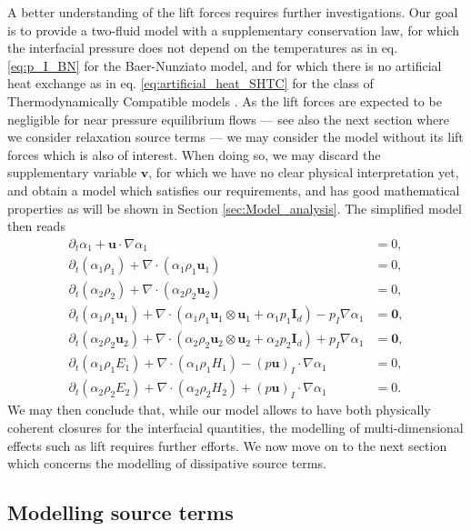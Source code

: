 \documentclass{myclass}
\newcommand{\Id}{\mathbf{I}_d}
\newcommand{\vel}{\bm{u}}
\newcommand{\pth}[1]  {\left( #1 \right)}
\begin{document}
A better understanding of the lift forces requires further investigations. Our goal is to provide a two-fluid model with a supplementary conservation law, for which the interfacial pressure does not depend on the temperatures as in eq. \eqref{eq:p_I_BN} for the Baer-Nunziato model, and for which there is no artificial heat exchange as in eq. \eqref{eq:artificial_heat_SHTC} for the class of Thermodynamically Compatible models \cite{romenski:2007,romenski:2010}. As the lift forces are expected to be negligible for near pressure equilibrium flows --- see also the next section where we consider relaxation source terms --- we may consider the model without its lift forces which is also of interest. When doing so, we may discard the supplementary variable $\bm{v}$, for which we have no clear physical interpretation yet, and obtain a model which satisfies our requirements, and has good mathematical properties as will be shown in Section \ref{sec:Model_analysis}. The simplified model then reads
\begin{subequations}
\begin{align}
\partial_t\alpha_1 + \vel\cdot\nabla\alpha_1 &=0,\\
\partial_t \pth{\alpha_1\rho_1} + \nabla\cdot\pth{\alpha_1\rho_1 \vel_1} &=0,\\
\partial_t \pth{\alpha_2\rho_2} + \nabla\cdot\pth{\alpha_2\rho_2 \vel_2} &=0,\\
\partial_t\pth{\alpha_1\rho_1\vel_1} + \nabla\cdot\pth{\alpha_1\rho_1\vel_1\otimes\vel_1 + \alpha_1 p_1\Id} - p_I\nabla\alpha_1 &=\bm{0},\\
\partial_t\pth{\alpha_2\rho_2\vel_2} + \nabla\cdot\pth{\alpha_2\rho_2\vel_2\otimes\vel_2 + \alpha_2 p_2\Id} + p_I\nabla\alpha_1 &=\bm{0},\\
\partial_t\pth{\alpha_1\rho_1 E_1} + \nabla\cdot\pth{\alpha_1\rho_1 H_1} - \pth{p\vel}_I\cdot\nabla\alpha_1 &= 0,\\
\partial_t\pth{\alpha_2\rho_2 E_2} + \nabla\cdot\pth{\alpha_2\rho_2 H_2} + \pth{p\vel}_I\cdot\nabla\alpha_1 &= 0.
\end{align}\label{syst:energy_form_without_lift}
\end{subequations}
We may then conclude that, while our model allows to have both physically coherent closures for the interfacial quantities, the modelling of multi-dimensional effects such as lift requires further efforts. We now move on to the next section which concerns the modelling of dissipative source terms.

\subsection{Modelling source terms}
\end{document}
